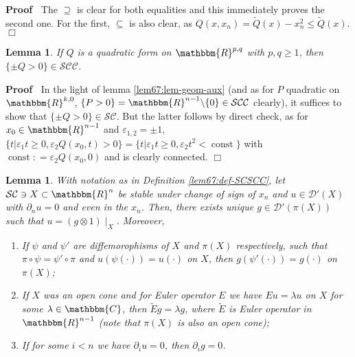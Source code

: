 \documentclass{article}
\newcommand{\tmop}[1]{\ensuremath{\operatorname{#1}}}
\renewenvironment{proof}{\noindent\textbf{Proof\ }}{\hspace*{\fill}$\Box$\medskip}
\newtheorem{lemma}[proposition]{Lemma}
\theoremstyle{remark}
\begin{document}
\begin{proof}
  The $\supseteq$ is clear for both equalities and this immediately proves the
  second one. For the first, $\subseteq$ is also clear, as $Q (x, x_n) =
  \tilde{Q} (x) - x_n^2 \leqslant \tilde{Q} (x)$.
\end{proof}

\begin{lemma}
  \label{lem67:lem-geom}If $Q$ is a quadratic form on $\mathbbm{R}^{p, q}$
  with $p, q \geqslant 1$, then $\{ \pm Q > 0 \} \in
  \mathcal{S}\mathcal{C}\mathcal{C}$.
\end{lemma}

\begin{proof}
  In the light of lemma \ref{lem67:lem-geom-aux} (and as for $P$ quadratic on
  $\mathbbm{R}^{k, 0}$, $\{ P > 0 \} =\mathbbm{R}^{n - 1} \backslash \{ 0 \}
  \in \mathcal{S}\mathcal{C}\mathcal{C}$ clearly), it suffices to show that
  $\{ \pm Q > 0 \} \in \mathcal{S}\mathcal{C}$. But the latter follows by
  direct check, as for $x_0 \in \mathbbm{R}^{n - 1}$ and $\varepsilon_{1, 2} =
  \pm 1$, $\{ t | \varepsilon_1 t \geqslant 0, \varepsilon_2 Q (x_0, t) > 0 \}
  = \{ t | \varepsilon_1 t \geqslant 0, \varepsilon_2 t^2 < \tmop{const} \}$
  with $\tmop{const} : = \varepsilon_2 Q (x_0, 0)$ and is clearly connected.
\end{proof}

\begin{lemma}
	\label{lem67:lem-tensor-aux}With notation as in Definition \ref{lem67:def-SCSCC}, let $\mathcal{S}\mathcal{C} \ni X \subset
  \mathbbm{R}^n$ be stable under change of sign of $x_n$ and $u \in
  \mathcal{D}' (X)$ with $\partial_n u = 0$ and even in the $x_n$. Then, there
  exists unique $g \in \mathcal{D}' (\pi (X))$ such that $u = (g \otimes 1)
  \mid_X$. Moreover,
  \begin{enumerate}
    \item If $\psi$ and $\psi'$ are diffemorophisms of $X$ and $\pi (X)$
    respectively, such that $\pi \circ \psi = \psi' \circ \pi$ and $u (\psi
    (\cdot)) = u (\cdot)$ on $X$, then $g (\psi' (\cdot)) = g (\cdot)$ on $\pi
    (X)$;
    
    \item If $X$ was an open cone and for Euler operator $E$ we have $E u =
    \lambda u$ on $X$ for some $\lambda \in \mathbbm{C}$, then $\tilde{E} g =
    \lambda g$, where $\tilde{E}$ is Euler operator in $\mathbbm{R}^{n - 1}$
    (note that $\pi (X)$ is also an open cone);
    
    \item If for some $i < n$ we have $\partial_i u = 0$, then $\partial_i g =
    0$.
  \end{enumerate}
\end{lemma}
\end{document}

